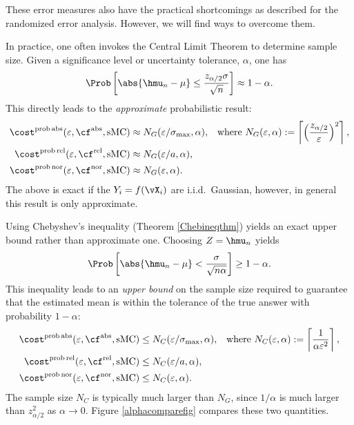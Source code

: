 \documentclass[12pt]{amsart}
\DeclareMathOperator{\abso}{abs}
\DeclareMathOperator{\rel}{rel}
\DeclareMathOperator{\nor}{nor}
\DeclareMathOperator{\prob}{prob}
\DeclareMathOperator{\sMC}{sMC}
\begin{document}
These error measures also have the practical shortcomings as described for the randomized error analysis.  However, we will find ways to overcome them.


In practice, one often invokes the Central Limit Theorem to determine sample size. Given a significance level or uncertainty tolerance, $\alpha$, one has
\[
\Prob\left[\abs{\hmu_n-\mu} \le \frac{z_{\alpha/2} \sigma}{\sqrt{n}} \right] \approx 1-\alpha.
\]
This directly leads to  the \emph{approximate} probabilistic result:
\begin{subequations} \label{proberrcritsampleGauss}
\begin{align}
\cost^{\prob\abso}(\varepsilon,\cf^{\abso},\sMC) &\approx  N_{G}(\varepsilon/\sigma_{\max},\alpha), & \text{where } N_{G}(\varepsilon,\alpha) :=\left \lceil \left(\frac{z_{\alpha/2}}{\varepsilon}\right)^2 \right \rceil,\\
\cost^{\prob\rel}(\varepsilon,\cf^{\rel},\sMC) & \approx  N_{G}(\varepsilon/a,\alpha), \\
\cost^{\prob\nor}(\varepsilon,\cf^{\nor},\sMC) &\approx  N_{G}(\varepsilon,\alpha).
\end{align}
\end{subequations}
The above is exact if the $Y_i=f(\vX_i)$ are i.i.d.\ Gaussian, however, in general this result is only approximate.

Using Chebyshev's inequality (Theorem \ref{Chebineqthm}) yields an exact upper bound rather than approximate one.  Choosing $Z=\hmu_n$ yields
\[
\Prob\left[\abs{\hmu_n-\mu} < \frac{\sigma}{\sqrt{n \alpha}} \right] \ge 1-\alpha.
\]
This inequality leads to an \emph{upper bound} on the sample size required to guarantee that the estimated mean is within the tolerance of the true answer with probability $1-\alpha$:
\begin{subequations} \label{proberrcritsampleCheby}
\begin{align}
\cost^{\prob\abso}(\varepsilon,\cf^{\abso},\sMC) &\le N_{C}(\varepsilon/\sigma_{\max},\alpha), & \text{where }N_{C}(\varepsilon,\alpha) :=\left \lceil \frac{1}{\alpha\varepsilon^2} \right \rceil,\\
\cost^{\prob\rel}(\varepsilon,\cf^{\rel},\sMC) & \le N_{C}(\varepsilon/a,\alpha), \\
\cost^{\prob\nor}(\varepsilon,\cf^{\nor},\sMC) &\le N_{C}(\varepsilon,\alpha).
\end{align}
\end{subequations}
The sample size $N_C$ is typically much larger than $ N_G$, since $1/\alpha$ is much larger than $z_{\alpha/2}^2$ as $\alpha \to 0$.  Figure \ref{alphacomparefig} compares these two quantities.
\end{document}
